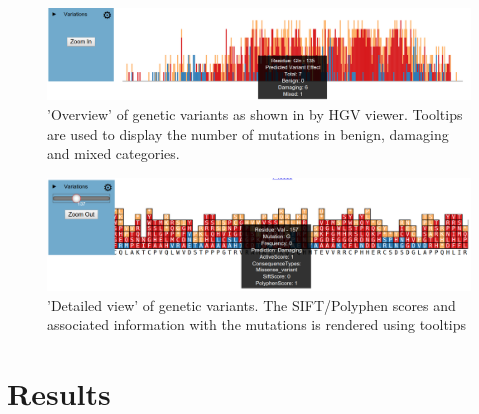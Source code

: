 \documentclass[twoside]{article}
\begin{document}
\begin{multicols}{2}


\begin{figure}
\includegraphics[width=\linewidth]{overview_withtooltip}
\caption{'Overview' of genetic variants as shown in by HGV viewer. Tooltips are used to display the number of mutations in benign, damaging and mixed categories.}
\end{figure}
\begin{figure}
\includegraphics[width=\linewidth]{zoomed_withtooltip}
\caption{'Detailed view' of genetic variants. The SIFT/Polyphen scores and associated information with the mutations is rendered using tooltips}
\end{figure}




\section{Results}




\end{multicols}
\end{document}
